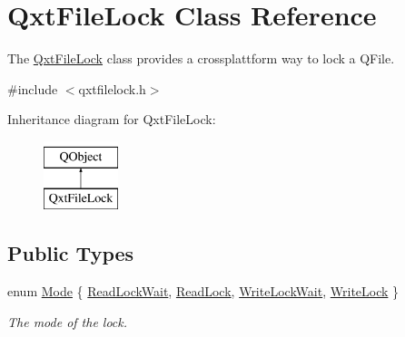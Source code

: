 \hypertarget{class_qxt_file_lock}{\section{Qxt\-File\-Lock Class Reference}
\label{class_qxt_file_lock}
}


The \hyperlink{class_qxt_file_lock}{Qxt\-File\-Lock} class provides a crossplattform way to lock a Q\-File.  




{\ttfamily \#include $<$qxtfilelock.\-h$>$}

Inheritance diagram for Qxt\-File\-Lock\-:\begin{figure}[H]
\begin{center}
\leavevmode
\includegraphics[height=2.000000cm]{class_qxt_file_lock}
\end{center}
\end{figure}
\subsection*{Public Types}
\begin{DoxyCompactItemize}
\item 
enum \hyperlink{class_qxt_file_lock_a98ad3e1055038fd611ad64755f794835}{Mode} \{ \hyperlink{class_qxt_file_lock_a98ad3e1055038fd611ad64755f794835a86e726f4f6789c0de7340faffd11cd69}{Read\-Lock\-Wait}, 
\hyperlink{class_qxt_file_lock_a98ad3e1055038fd611ad64755f794835a223d75634f685f407b41e2ba89e0c455}{Read\-Lock}, 
\hyperlink{class_qxt_file_lock_a98ad3e1055038fd611ad64755f794835a45a077cb75b9087e319da24486005ba2}{Write\-Lock\-Wait}, 
\hyperlink{class_qxt_file_lock_a98ad3e1055038fd611ad64755f794835aa65a3bba221d8823412b16746b5a8c17}{Write\-Lock}
 \}
\begin{DoxyCompactList}\small\item\em The mode of the lock. \end{DoxyCompactList}\end{DoxyCompactItemize}
